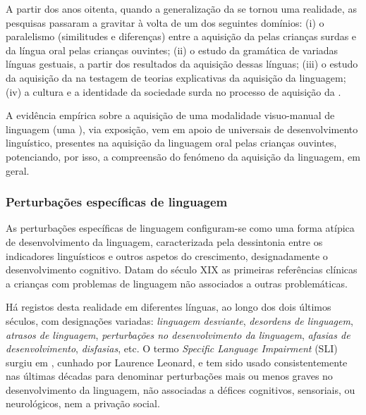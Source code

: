 \documentclass[output=paper]{LSP/langsci}
\begin{document}
A partir dos anos oitenta, quando a generalização da  se tornou uma realidade, as pesquisas passaram a gravitar à volta de um dos seguintes domínios: (i) o paralelismo (similitudes e diferenças) entre a aquisição da  pelas crianças surdas e da língua oral pelas crianças ouvintes; (ii) o estudo da gramática de variadas línguas gestuais, a partir dos resultados da aquisição dessas línguas; (iii) o estudo da aquisição da  na testagem de teorias explicativas da aquisição da linguagem; (iv) a cultura e a identidade da sociedade surda no processo de aquisição da .

A evidência empírica sobre a aquisição de uma modalidade visuo-manual de linguagem (uma ), via exposição, vem em apoio de universais de desenvolvimento linguístico, presentes na aquisição da linguagem oral pelas crianças ouvintes, potenciando, por isso, a compreensão do fenómeno da aquisição da linguagem, em geral.

\subsubsection{Perturbações específicas de linguagem}
\label{subsubsec:simsim_perturbacoes}
As perturbações específicas de linguagem configuram-se como uma forma atípica de desenvolvimento da linguagem, caracterizada pela dessintonia entre os indicadores linguísticos e outros aspetos do crescimento, designadamente o desenvolvimento cognitivo. Datam do século XIX \citep{gall1822} as primeiras referências clínicas a crianças com problemas de linguagem não associados a outras problemáticas.

Há registos desta realidade em diferentes línguas, ao longo dos dois últimos séculos, com designações variadas: \textit{linguagem desviante}, \textit{desordens de linguagem}, \textit{atrasos de linguagem}, \textit{perturbações no desenvolvimento da linguagem}, \textit{afasias de desenvolvimento}, \textit{disfasias}, etc. O termo \textit{Specific Language Impairment} (SLI) surgiu em \citeyear{leonard1981}, cunhado por Laurence Leonard, e tem sido usado consistentemente nas últimas décadas para denominar perturbações mais ou menos graves no desenvolvimento da linguagem, não associadas a défices cognitivos, sensoriais, ou neurológicos, nem a privação social.
\end{document}
